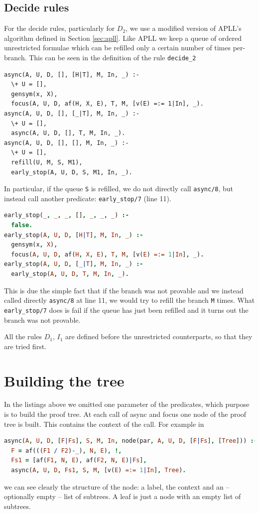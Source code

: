 \documentclass[a4paper, 12pt, tesi, english]{report}
\begin{document}
\subsection{Decide rules}\label{sec:decide}
For the decide rules, particularly for $D_2$, we use a modified version of APLL's algorithm defined in Section \ref{sec:apll}.
Like APLL we keep a queue of ordered unrestricted formulae which can be refilled only a certain number of times per-branch.
This can be seen in the definition of the rule \texttt{decide\_2}
\begin{lstlisting}
async(A, U, D, [], [H|T], M, In, _) :-
  \+ U = [],
  gensym(x, X),
  focus(A, U, D, af(H, X, E), T, M, [v(E) =:= 1|In], _).
async(A, U, D, [], [_|T], M, In, _) :-
  \+ U = [],
  async(A, U, D, [], T, M, In, _).
async(A, U, D, [], [], M, In, _) :-
  \+ U = [],
  refill(U, M, S, M1),
  early_stop(A, U, D, S, M1, In, _).
\end{lstlisting}
In particular, if the queue \texttt{S} is refilled, we do not directly call \texttt{async/8}, but instead call another predicate: \texttt{early\_stop/7} (line 11).
\begin{lstlisting}[language=prolog, numbers=none]
early_stop(_, _, _, [], _, _, _) :-
  false.
early_stop(A, U, D, [H|T], M, In, _) :-
  gensym(x, X),
  focus(A, U, D, af(H, X, E), T, M, [v(E) =:= 1|In], _).
early_stop(A, U, D, [_|T], M, In, _) :-
  early_stop(A, U, D, T, M, In, _).
\end{lstlisting}
This is due the simple fact that if the branch was not provable and we instead called directly \texttt{async/8} at line 11, we would try to refill the branch \texttt{M} times.
What \texttt{early\_stop/7} does is fail if the queue has just been refilled and it turns out the branch was not provable.

All the rules $D_1$, $I_1$ are defined before the unrestricted counterparts, so that they are tried first.

\section{Building the tree}
In the listings above we omitted one parameter of the predicates, which purpose is to build the proof tree.
At each call of async and focus one node of the proof tree is built.
This contains the context of the call.
For example in
\begin{lstlisting}[language=prolog, numbers=none]
async(A, U, D, [F|Fs], S, M, In, node(par, A, U, D, [F|Fs], [Tree])) :- 
  F = af(((F1 / F2)-_), N, E), !,
  Fs1 = [af(F1, N, E), af(F2, N, E)|Fs],
  async(A, U, D, Fs1, S, M, [v(E) =:= 1|In], Tree).
\end{lstlisting}
we can see clearly the structure of the node: a label, the context and an -- optionally empty -- list of subtrees.
A leaf is just a node with an empty list of subtrees.
\end{document}
